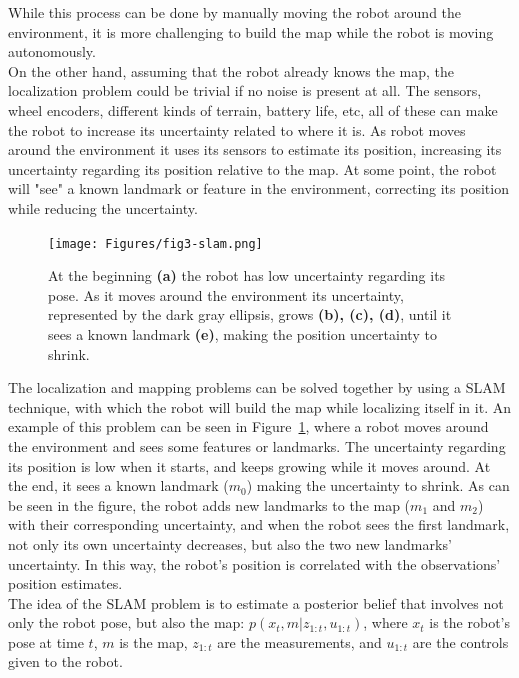 While this process can be done by manually moving the robot around the environment, it is more challenging to build the map while the robot is moving autonomously. \\

\nocite{intro-aut-mobile-robots}
On the other hand, assuming that the robot already knows the map, the localization problem could be trivial if no noise is present at all. The sensors, wheel encoders, different kinds of terrain, battery life, etc, all of these can make the robot to increase its uncertainty related to where it is. As robot moves around the environment it uses its sensors to estimate its position, increasing its uncertainty regarding its position relative to the map. At some point, the robot will "see" a known landmark or feature in the environment, correcting its position while reducing the uncertainty.\\

\begin{figure}[h]
    \centering
    \texttt{[image: Figures/fig3-slam.png]}
    \caption[Example of SLAM problem]{At the beginning \textbf{(a)} the robot has low uncertainty regarding its pose. As it moves around the environment its uncertainty, represented by the dark gray ellipsis, grows \textbf{(b), (c), (d)}, until it sees a known landmark \textbf{(e)}, making the position uncertainty to shrink. \cite{intro-aut-mobile-robots}}
    \label{fig:chapter1:slam}
\end{figure}

The localization and mapping problems can be solved together by using a SLAM technique, with which the robot will build the map while localizing itself in it. An example of this problem can be seen in Figure~\ref{fig:chapter1:slam}, where a robot moves around the environment and sees some features or landmarks. The uncertainty regarding its position is low when it starts, and keeps growing while it moves around. At the end, it sees a known landmark ($m_0$) making the uncertainty to shrink. As can be seen in the figure, the robot adds new landmarks to the map ($m_1$ and $m_2$) with their corresponding uncertainty, and when the robot sees the first landmark, not only its own uncertainty decreases, but also the two new landmarks' uncertainty. In this way, the robot's position is correlated with the observations' position estimates.\\

The idea of the SLAM problem is to estimate a posterior belief that involves not only the robot pose, but also the map: $p\left(x_t, m | z_{1:t}, u_{1:t}\right)$, where $x_t$ is the robot's pose at time $t$, $m$ is the map, $z_{1:t}$ are the measurements, and $u_{1:t}$ are the controls given to the robot.

